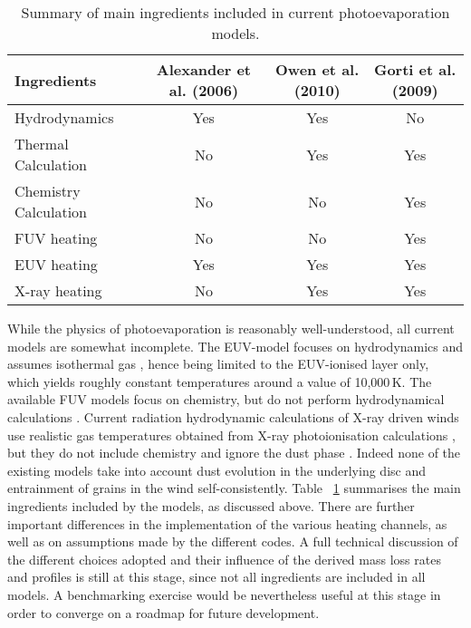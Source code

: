 \documentclass{rsos}
\begin{document}
\begin{table}
\noindent
\begin{tabular}{lccc}
\hline
Ingredients           & Alexander et al. (2006) & Owen et al. (2010) & Gorti et al. (2009) \\ 
\hline
Hydrodynamics         &    Yes                  &     Yes            &  No                 \\
Thermal Calculation   &    No                   &     Yes            &  Yes                \\
Chemistry Calculation &    No                   &     No             &  Yes                \\
FUV heating           &    No                   &     No             &  Yes                \\
EUV heating           &    Yes                  &     Yes            &  Yes                \\
X-ray heating         &    No                   &     Yes            &  Yes                \\
\hline 
\end{tabular}
\caption{Summary of main ingredients included in current photoevaporation models.}
\label{tab:models}
\end{table}


While the physics of photoevaporation is reasonably well-understood, all current models are somewhat incomplete. The EUV-model focuses on hydrodynamics and assumes isothermal gas %
\cite{2004ApJ...607..890F, 2006MNRAS.369..229A,2006MNRAS.369..216A}, hence being limited to the EUV-ionised layer only, which yields roughly constant temperatures around a value of 10,000\,K. The available FUV models focus on chemistry, but do not perform hydrodynamical calculations \cite{2009ApJ...705.1237G, 2015ApJ...804...29G}.
Current radiation hydrodynamic calculations of X-ray driven winds use realistic gas temperatures obtained from X-ray photoionisation calculations \cite{2009ApJ...699.1639E}, but they do not include chemistry and ignore the dust phase \cite{2010MNRAS.401.1415O, 2011MNRAS.412...13O, 2012MNRAS.422.1880O}. Indeed none of the existing models take into account dust evolution in the underlying disc and entrainment of grains in the wind self-consistently. Table ~\ref{tab:models} summarises the main ingredients included by the models, as discussed above. There are further important differences in the implementation of the various heating channels, as well as on assumptions made by the different codes. A full technical discussion of the different choices adopted and their influence of the derived mass loss rates and profiles is still at this stage, since not all ingredients are included in all models. A benchmarking exercise would be nevertheless useful at this stage in order to converge on a roadmap for future development.
\end{document}
